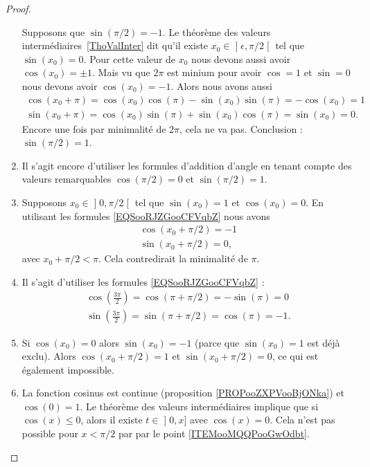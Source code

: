 \begin{proof}
\begin{enumerate}
        Supposons que \( \sin(\pi/2)=-1\). Le théorème des valeurs intermédiaires~\ref{ThoValInter} dit qu'il existe \( x_0\in\mathopen] \epsilon , \pi/2 \mathclose[\) tel que \( \sin(x_0)=0\). Pour cette valeur de \( x_0\) nous devons aussi avoir \( \cos(x_0)=\pm 1\). Mais vu que \( 2\pi\) est minium pour avoir \( \cos=1\) et \( \sin=0\) nous devons avoir \( \cos(x_0)=-1\). Alors nous avons aussi
            \begin{subequations}
                \begin{align}
                    \cos(x_0+\pi)=\cos(x_0)\cos(\pi)-\sin(x_0)\sin(\pi)=-\cos(x_0)=1\\
                    \sin(x_0+\pi)=\cos(x_0)\sin(\pi)+\sin(x_0)\cos(\pi)=\sin(x_0)=0.
                \end{align}
            \end{subequations}
            Encore une fois par minimalité de \( 2\pi\), cela ne va pas. Conclusion : \( \sin(\pi/2)=1\).
        \item
            Il s'agit encore d'utiliser les formules d'addition d'angle en tenant compte des valeurs remarquables \( \cos(\pi/2)=0\) et \( \sin(\pi/2)=1\).
        \item
        Supposons \( x_0\in\mathopen] 0 , \pi/2 \mathclose[\) tel que \( \sin(x_0)=1\) et \( \cos(x_0)=0\). En utilisant les formules \eqref{EQSooRJZGooCFVqbZ} nous avons
            \begin{subequations}
                \begin{align}
                    \cos(x_0+\pi/2)=-1\\
                    \sin(x_0+\pi/2)=0,
                \end{align}
            \end{subequations}
            avec \( x_0+\pi/2<\pi\). Cela contredirait la minimalité de \( \pi\).
        \item
            Il s'agit d'utiliser les formules \eqref{EQSooRJZGooCFVqbZ} :
            \begin{subequations}
                \begin{align}
                    \cos(\frac{ 3\pi }{ 2 })=\cos(\pi+\pi/2)=-\sin(\pi)=0\\
                    \sin(\frac{ 3\pi }{ 2 })=\sin(\pi+\pi/2)=\cos(\pi)=-1.
                \end{align}
            \end{subequations}
        \item
            Si \( \cos(x_0)=0\) alors \( \sin(x_0)=-1\) (parce que \( \sin(x_0)=1\) est déjà exclu). Alors \( \cos(x_0+\pi/2)=1\) et \( \sin(x_0+\pi/2)=0\), ce qui est également impossible.
        \item
        La fonction cosinus est continue (proposition \ref{PROPooZXPVooBjONka}) et \( \cos(0)=1\). Le théorème des valeurs intermédiaires implique que si \( \cos(x)\leq 0\), alors il existe \( t\in \mathopen] 0 , x \mathclose]\) avec \( \cos(x)=0\). Cela n'est pas possible pour \( x<\pi/2\) par par le point \ref{ITEMooMQQPooGwOdbt}.


\end{enumerate}
\end{proof}
